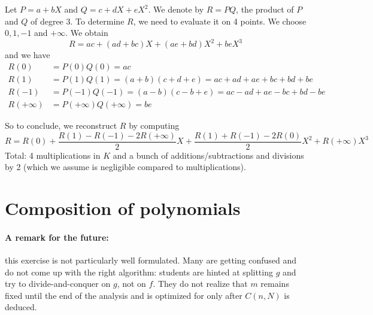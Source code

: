 \documentclass[11pt]{exam}
\theoremstyle{definition}
\begin{document}
\begin{solution}
	Let $P = a + bX$ and $Q = c + d X + e X^2$. We denote by $R = PQ$, the product of $P$ and $Q$ of degree 3. To determine $R$, we need to evaluate it on 4 points. We choose $0,1,-1$ and $+\infty$.
	We obtain
	$$ R = ac + (ad+bc)X + (ae+bd) X^2 + be X^3$$
	and we have
	\begin{align*}
	R(0) &= P(0) Q(0) = ac \\
	R(1) &= P(1) Q(1) = (a+b)(c+d+e) = ac + ad + ae + bc + bd + be \\
	R(-1) &= P(-1) Q(-1) = (a-b)(c-b+e) = ac - ad + ae - bc + bd - be \\
	R(+\infty) &= P(+\infty) Q(+\infty) = be
	\end{align*}
	
	So to conclude, we reconstruct $R$ by computing 
	$$ R = R(0) + \frac{R(1)-R(-1)-2R(+\infty)}{2} X + \frac{R(1)+R(-1)-2R(0)}{2} X^2 + R(+\infty) X^3$$
	Total: 4 multiplications in $K$ and a bunch of additions/subtractions and divisions by 2 (which we assume is negligible compared to multiplications).
\end{solution}

\section{Composition of polynomials}

\paragraph{A remark for the future:} this exercise is not particularly well formulated. Many are getting confused and do not come up with the right algorithm: students are hinted at splitting $g$ and try to divide-and-conquer on $g$, not on $f$. They do not realize that $m$ remains fixed until the end of the analysis and is optimized for only after $C(n,N)$ is deduced.
\end{document}
